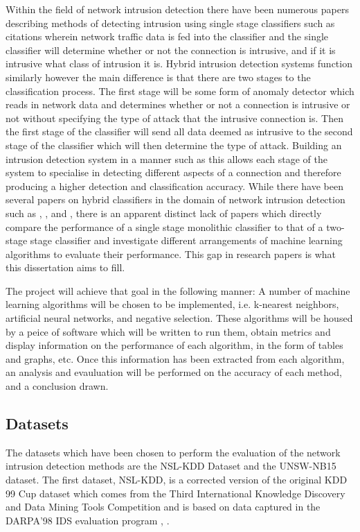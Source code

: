 	Within the field of network intrusion detection there have been numerous papers describing methods of detecting intrusion using single stage classifiers such as {citations} wherein network traffic data is fed into the classifier and the single classifier will determine whether or not the connection is intrusive, and if it is intrusive what class of intrusion it is. Hybrid intrusion detection systems function similarly however the main difference is that there are two stages to the classification process. The first stage will be some form of anomaly detector which reads in network data and determines whether or not a connection is intrusive or not without specifying the type of attack that the intrusive connection is. Then the first stage of the classifier will send all data deemed as intrusive to the second stage of the classifier which will then determine the type of attack. Building an intrusion detection system in a manner such as this allows each stage of the system to specialise in detecting different aspects of a connection and therefore producing a higher detection and classification accuracy. While there have been several papers on hybrid classifiers in the domain of network intrusion detection such as \cite{powers2008hybrid}, \cite{panda2012hybrid}, and \cite{zhang2006hybrid}, there is an apparent distinct lack of papers which directly compare the performance of a single stage monolithic classifier to that of a two-stage stage classifier and investigate different arrangements of machine learning algorithms to evaluate their performance. This gap in research papers is what this dissertation aims to fill.
	
	The project will achieve that goal in the following manner: A number of machine learning algorithms will be chosen to be implemented, i.e. k-nearest neighbors, artificial neural networks, and negative selection. These algorithms will be housed by a peice of software which will be written to run them, obtain metrics and display information on the performance of each algorithm, in the form of tables and graphs, etc. Once this information has been extracted from each algorithm, an analysis and evauluation will be performed on the accuracy of each method, and a conclusion drawn.
		
	\subsection{Datasets}
	The datasets which have been chosen to perform the evaluation of the network intrusion detection methods are the NSL-KDD Dataset and the UNSW-NB15 dataset. The first dataset, NSL-KDD, is a corrected version of the original KDD 99 Cup dataset which comes from the Third International Knowledge Discovery and Data Mining Tools Competition and is based on data captured in the DARPA'98 IDS evaluation program \cite{Lippmann2000darpa}, \cite{tavallaee2009detailed}. 
	

